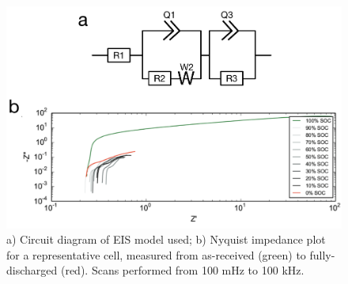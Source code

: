 \begin{figure}[htb]
  \centering
    \includegraphics[width=\textwidth]{ch-appendices/images/Supp5.pdf}
    \caption[Equivalent circuit model and Nyquist plot for \textit{in situ} EIS performed on a AA alkaline battery]{a) Circuit diagram of EIS model used; b) Nyquist impedance plot for a representative cell, measured from as-received (green) to fully-discharged (red). Scans performed from 100 mHz to 100 kHz.}
    \label{fig:EIS}
\end{figure}